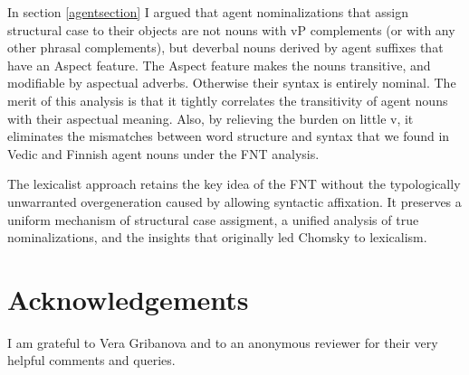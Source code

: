 \documentclass[output=paper,
modfonts
]{LSP/langsci}
\begin{document}
In section \ref{agentsection} I argued that agent nominalizations that assign structural
case to their objects are not nouns with vP complements (or with any other phrasal
complements), but deverbal nouns derived by agent suffixes that have an Aspect feature.  The
Aspect feature makes the nouns transitive, and modifiable by aspectual adverbs.  Otherwise
their syntax is entirely nominal.  The merit of this analysis is that it tightly correlates the
transitivity of agent nouns with their aspectual meaning.  Also, by relieving the burden on
little v, it eliminates the mismatches between word structure and syntax that we found in Vedic
and Finnish agent nouns under the FNT analysis.

The lexicalist approach retains the key idea of the FNT without the typologically unwarranted
overgeneration caused by allowing syntactic affixation. It preserves a uniform mechanism of
structural case assigment, a unified analysis of true nominalizations, and the insights that
originally led Chomsky to lexicalism.


\section*{Acknowledgements}
I am grateful to Vera Gribanova and to an
    anonymous reviewer for their very helpful comments and queries.


\printbibliography[heading=subbibliography,notkeyword=this]

\end{document}
